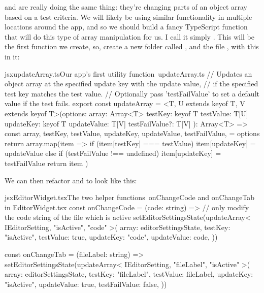 \documentclass[paper=6in:9in,pagesize=pdftex,headinclude=on,footinclude=on,12pt,twoside]{scrbook}
\begin{document}

 and  are really doing the same thing: they're changing parts of an object array based on a test criteria. We will likely be using similar functionality in multiple locations around the app, and so we should build a fancy TypeScript function that will do this type of array manipulation for us. I call it simply . This will be the first  function we create, so, create a new folder called , and the file , with this in it:

\begin{codeInput}{jsx}{updateArray.ts}{Our app's first utility function\, updateArray.ts}
// Updates an object array at the specified update key with the update value,
// if the specified test key matches the test value.
// Optionally pass 'testFailValue' to set a default value if the test fails.
export const updateArray = <T, U extends keyof T, V extends keyof T>(options: {
  array: Array<T>
  testKey: keyof T
  testValue: T[U]
  updateKey: keyof T
  updateValue: T[V]
  testFailValue?: T[V]
}): Array<T> => {
  const {
    array,
    testKey,
    testValue,
    updateKey,
    updateValue,
    testFailValue,
  } = options
  return array.map(item => {
    if (item[testKey] === testValue) {
      item[updateKey] = updateValue
    } else if (testFailValue !== undefined) {
      item[updateKey] = testFailValue
    }
    return item
  })
}  
\end{codeInput}

We can then refactor  and  to look like this:

\begin{codeInput}{jsx}{EditorWidget.tsx}{The two helper functions\, onChangeCode and onChangeTab in EditorWidget.tsx}
const onChangeCode = (code: string) => {
  // only modify the code string of the file which is active
  setEditorSettingsState(updateArray<
    IEditorSetting,
    "isActive",
    "code"
  >({
    array: editorSettingsState,
    testKey: "isActive",
    testValue: true,
    updateKey: "code",
    updateValue: code,
  }))
}

const onChangeTab = (fileLabel: string) => {
  setEditorSettingsState(updateArray<
    IEditorSetting,
    "fileLabel",
    "isActive"
  >({
    array: editorSettingsState,
    testKey: "fileLabel",
    testValue: fileLabel,
    updateKey: "isActive",
    updateValue: true,
    testFailValue: false,
  }))
}
\end{codeInput}
\end{document}
